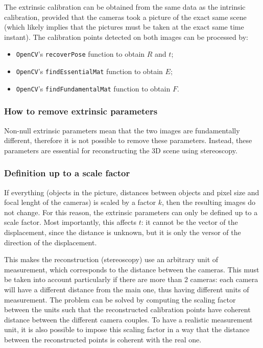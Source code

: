 The extrinsic calibration can be obtained from the same data as the intrinsic calibration, provided that the cameras took a picture of the exact same scene (which likely implies that the pictures must be taken at the exact same time instant).
The calibration points detected on both images can be processed by:
\begin{itemize}
	\itemsep 0em
	\item \texttt{OpenCV}'s \texttt{recoverPose} function to obtain $R$ and $t$;
	\item \texttt{OpenCV}'s \texttt{findEssentialMat} function to obtain $E$;
	\item \texttt{OpenCV}'s \texttt{findFundamentalMat} function to obtain $F$.
\end{itemize}

\subsubsection{How to remove extrinsic parameters}

Non-null extrinsic parameters mean that the two images are fundamentally different, therefore it is not possible to remove these parameters.
Instead, these parameters are essential for reconstructing the 3D scene using stereoscopy.

\subsubsection{Definition up to a scale factor}

If everything (objects in the picture, distances between objects and pixel size and focal lenght of the cameras) is scaled by a factor $k$, then the resulting images do not change.
For this reason, the extrinsic parameters can only be defined up to a scale factor.
Most importantly, this affects $t$: it cannot be the vector of the displacement, since the distance is unknown, but it is only the versor of the direction of the displacement.

This makes the reconstruction (stereoscopy) use an arbitrary unit of measurement, which corresponds to the distance between the cameras.
This must be taken into account particularly if there are more than 2 cameras: each camera will have a different distance from the main one, thus having different units of measurement.
The problem can be solved by computing the scaling factor between the units such that the reconstructed calibration points have coherent distance between the different camera couples.
To have a realistic measurement unit, it is also possible to impose this scaling factor in a way that the distance between the reconstructed points is coherent with the real one.

